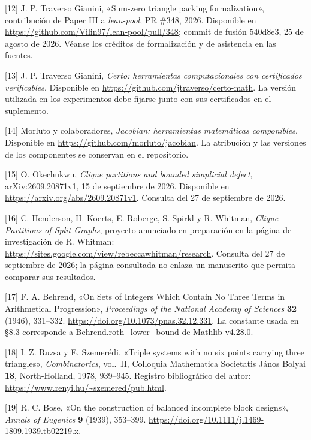 \documentclass[spanish,11pt,a4paper]{article}
\begin{document}
{[}12{]} J. P. Traverso Gianini, «Sum-zero triangle packing formalization», contribución de Paper III a \emph{lean-pool}, PR \#348, 2026. Disponible en \url{https://github.com/Vilin97/lean-pool/pull/348}; commit de fusión {\ttfamily\small 540d8e3}, 25 de agosto de 2026. Véanse los créditos de formalización y de asistencia en las fuentes.

{[}13{]} J. P. Traverso Gianini, \emph{Certo: herramientas computacionales con certificados verificables}. Disponible en \url{https://github.com/jtraverso/certo-math}. La versión utilizada en los experimentos debe fijarse junto con sus certificados en el suplemento.

{[}14{]} Morluto y colaboradores, \emph{Jacobian: herramientas matemáticas componibles}. Disponible en \url{https://github.com/morluto/jacobian}. La atribución y las versiones de los componentes se conservan en el repositorio.

{[}15{]} O. Okechukwu, \emph{Clique partitions and bounded simplicial defect}, arXiv:2609.20871v1, 15 de septiembre de 2026. Disponible en \url{https://arxiv.org/abs/2609.20871v1}. Consulta del 27 de septiembre de 2026.

{[}16{]} C. Henderson, H. Koerts, E. Roberge, S. Spirkl y R. Whitman, \emph{Clique Partitions of Split Graphs}, proyecto anunciado en preparación en la página de investigación de R. Whitman: \url{https://sites.google.com/view/rebeccawhitman/research}. Consulta del 27 de septiembre de 2026; la página consultada no enlaza un manuscrito que permita comparar sus resultados.

{[}17{]} F. A. Behrend, «On Sets of Integers Which Contain No Three Terms in Arithmetical Progression», \emph{Proceedings of the National Academy of Sciences} \textbf{32} (1946), 331--332. \url{https://doi.org/10.1073/pnas.32.12.331}. La constante usada en §8.3 corresponde a {\ttfamily\small Behrend.\discretionary{\hbox{\ensuremath{\hookrightarrow}}}{}{}roth\_\discretionary{\hbox{\ensuremath{\hookrightarrow}}}{}{}lower\_\discretionary{\hbox{\ensuremath{\hookrightarrow}}}{}{}bound} de Mathlib v4.28.0.

{[}18{]} I. Z. Ruzsa y E. Szemerédi, «Triple systems with no six points carrying three triangles», \emph{Combinatorics}, vol.~II, Colloquia Mathematica Societatis János Bolyai \textbf{18}, North-Holland, 1978, 939--945. Registro bibliográfico del autor: \url{https://www.renyi.hu/~szemered/pub.html}.

{[}19{]} R. C. Bose, «On the construction of balanced incomplete block designs», \emph{Annals of Eugenics} \textbf{9} (1939), 353--399. \url{https://doi.org/10.1111/j.1469-1809.1939.tb02219.x}.
\end{document}
